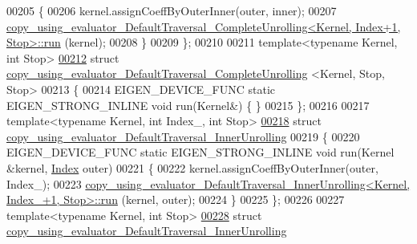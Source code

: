 \begin{DoxyCode}
00205   \{
00206     kernel.assignCoeffByOuterInner(outer, inner);
00207     
      \hyperlink{struct_eigen_1_1internal_1_1copy__using__evaluator___default_traversal___complete_unrolling}{copy\_using\_evaluator\_DefaultTraversal\_CompleteUnrolling<Kernel, Index+1, Stop>::run}
      (kernel);
00208   \}
00209 \};
00210 
00211 \textcolor{keyword}{template}<\textcolor{keyword}{typename} Kernel, \textcolor{keywordtype}{int} Stop>
\hyperlink{struct_eigen_1_1internal_1_1copy__using__evaluator___default_traversal___complete_unrolling_3_01c1b4c78ce0d389049a18ce1f9fdd8138}{00212} \textcolor{keyword}{struct }\hyperlink{struct_eigen_1_1internal_1_1copy__using__evaluator___default_traversal___complete_unrolling}{copy\_using\_evaluator\_DefaultTraversal\_CompleteUnrolling}
      <Kernel, Stop, Stop>
00213 \{
00214   EIGEN\_DEVICE\_FUNC \textcolor{keyword}{static} EIGEN\_STRONG\_INLINE \textcolor{keywordtype}{void} run(Kernel&) \{ \}
00215 \};
00216 
00217 \textcolor{keyword}{template}<\textcolor{keyword}{typename} Kernel, \textcolor{keywordtype}{int} Index\_, \textcolor{keywordtype}{int} Stop>
\hyperlink{struct_eigen_1_1internal_1_1copy__using__evaluator___default_traversal___inner_unrolling}{00218} \textcolor{keyword}{struct }\hyperlink{struct_eigen_1_1internal_1_1copy__using__evaluator___default_traversal___inner_unrolling}{copy\_using\_evaluator\_DefaultTraversal\_InnerUnrolling}
00219 \{
00220   EIGEN\_DEVICE\_FUNC \textcolor{keyword}{static} EIGEN\_STRONG\_INLINE \textcolor{keywordtype}{void} run(Kernel &kernel, \hyperlink{namespace_eigen_a62e77e0933482dafde8fe197d9a2cfde}{Index} outer)
00221   \{
00222     kernel.assignCoeffByOuterInner(outer, Index\_);
00223     
      \hyperlink{struct_eigen_1_1internal_1_1copy__using__evaluator___default_traversal___inner_unrolling}{copy\_using\_evaluator\_DefaultTraversal\_InnerUnrolling<Kernel, Index\_+1, Stop>::run}
      (kernel, outer);
00224   \}
00225 \};
00226 
00227 \textcolor{keyword}{template}<\textcolor{keyword}{typename} Kernel, \textcolor{keywordtype}{int} Stop>
\hyperlink{struct_eigen_1_1internal_1_1copy__using__evaluator___default_traversal___inner_unrolling_3_01_kernel_00_01_stop_00_01_stop_01_4}{00228} \textcolor{keyword}{struct }\hyperlink{struct_eigen_1_1internal_1_1copy__using__evaluator___default_traversal___inner_unrolling}{copy\_using\_evaluator\_DefaultTraversal\_InnerUnrolling}

\end{DoxyCode}
